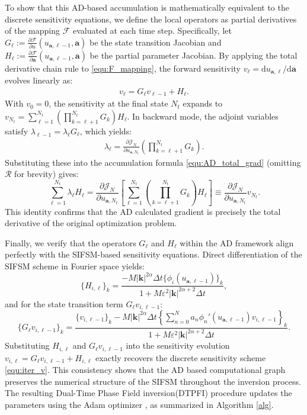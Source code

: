 \documentclass[11pt,reqno]{amsart}
\begin{document}
To show that this AD-based accumulation is mathematically equivalent to the discrete sensitivity equations, we define the local operators as partial derivatives of the mapping $\mathcal{F}$ evaluated at each time step. Specifically, let $G_\ell := \frac{\partial \mathcal{F}}{\partial u}(u_{\mathbf{a},\ell-1}, \mathbf{a})$ be the state transition Jacobian and $H_\ell := \frac{\partial \mathcal{F}}{\partial \mathbf{a}}(u_{\mathbf{a},\ell-1}, \mathbf{a})$ be the partial parameter Jacobian. By applying the total derivative chain rule to \eqref{equ:F_mapping}, the forward sensitivity $v_\ell = \mathrm{d} u_{\mathbf{a},\ell} / \mathrm{d} \mathbf{a}$ evolves linearly as:
\begin{align*}
	v_\ell = G_\ell v_{\ell-1} + H_\ell. 
\end{align*}
With $v_0 = 0$, the sensitivity at the final state $N_t$ expands to $v_{N_t} = \sum_{\ell=1}^{N_t} \left( \prod_{k=\ell+1}^{N_t} G_k \right) H_\ell$. In backward mode, the adjoint variables satisfy $\lambda_{\ell-1} = \lambda_\ell G_\ell$, which yields:
\begin{align*}
	\lambda_\ell = \frac{\partial \mathcal{J}_N}{\partial u_{\mathbf{a},N_t}} \left( \prod_{k=\ell+1}^{N_t} G_k \right).    
\end{align*}
Substituting these into the accumulation formula \eqref{equ:AD_total_grad} (omitting $\mathcal{R}$ for brevity) gives:
\begin{equation}
	\sum_{\ell=1}^{N_t} \lambda_\ell H_\ell = \frac{\partial \mathcal{J}_N}{\partial u_{\mathbf{a},N_t}} \left[ \sum_{\ell=1}^{N_t} \left( \prod_{k=\ell+1}^{N_t} G_k \right) H_\ell \right] \equiv \frac{\partial \mathcal{J}_N}{\partial u_{\mathbf{a},N_t}} v_{N_t}.
\end{equation}
This identity confirms that the AD calculated gradient is precisely the total derivative of the original optimization problem.

Finally, we verify that the operators $G_\ell$ and $H_\ell$ within the AD framework align perfectly with the SIFSM-based sensitivity equations. Direct differentiation of the SIFSM scheme in Fourier space yields:
\begin{equation}
	\{H_{i,\ell}\}_k = \frac{- M|\mathbf{k}|^{2\alpha}\Delta t \{\phi_i(u_{\mathbf{a},\ell-1})\}_k}{1 + M\varepsilon^2|\mathbf{k}|^{2\alpha+2}\Delta t},
\end{equation}
and for the state transition term $G_\ell v_{i,\ell-1}$:
\begin{equation}
	\{G_\ell v_{i,\ell-1}\}_k = \frac{\{v_{i,\ell-1}\}_k - M|\mathbf{k}|^{2\alpha}\Delta t \left\{ \sum_{n=0}^N a_n \phi_n'(u_{\mathbf{a},\ell-1}) v_{i,\ell-1} \right\}_k}{1 + M\varepsilon^2|\mathbf{k}|^{2\alpha+2}\Delta t}.
\end{equation}
Substituting $H_{i,\ell}$ and $G_\ell v_{i,\ell-1}$ into the sensitivity evolution $v_{i,\ell} = G_\ell v_{i,\ell-1} + H_{i,\ell}$ exactly recovers the discrete sensitivity scheme \eqref{equ:iter_v}. This consistency shows that the AD based computational graph preserves the numerical structure of the SIFSM throughout the inversion process. The resulting Dual-Time Phase Field inversion(DTPFI) procedure updates the parameters using the Adam optimizer \cite{kingma2014adam}, as summarized in Algorithm \ref{alg}.
\end{document}

